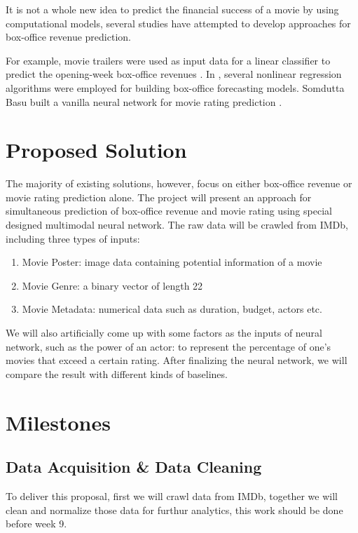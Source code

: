 \documentclass[conference]{IEEEtran}
\begin{document}
It is not a whole new idea to predict the financial success of a movie by using computational models, several studies have attempted to develop approaches for box-office revenue prediction.

For example, movie trailers were used as input data for a linear classifier to predict the opening-week box-office revenues \cite{trailer}. In \cite{boxoffice}, several nonlinear regression algorithms were employed for building box-office forecasting models. Somdutta Basu built a vanilla neural network for movie rating prediction \cite{rating}.

\section{Proposed Solution}

The majority of existing solutions, however, focus on either box-office revenue or movie rating prediction alone. The project will present an approach for simultaneous prediction of box-office revenue and movie rating using special designed multimodal neural network. The raw data will be crawled from IMDb, including three types of inputs:

\begin{enumerate}
  \item Movie Poster: image data containing potential information of a movie
  \item Movie Genre: a binary vector of length 22
  \item Movie Metadata: numerical data such as duration, budget, actors etc.
\end{enumerate}

We will also artificially come up with some factors as the inputs of neural network, such as the power of an actor: to represent the percentage of one's movies that exceed a certain rating. After finalizing the neural network, we will compare the result with different kinds of baselines.

\section{Milestones}

\subsection{Data Acquisition \& Data Cleaning}

To deliver this proposal, first we will crawl data from IMDb, together we will clean and normalize those data for furthur analytics, this work should be done before week 9.
\end{document}
